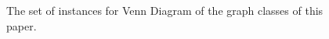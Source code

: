 \begin{figure}[htb]
\begin{tabular}{  c c c c  c}
  \end{tabular}
 \caption{The set of instances for Venn Diagram of the graph classes of this paper.}
 \label{fig:exemplosDiagram}
\end{figure}  
 